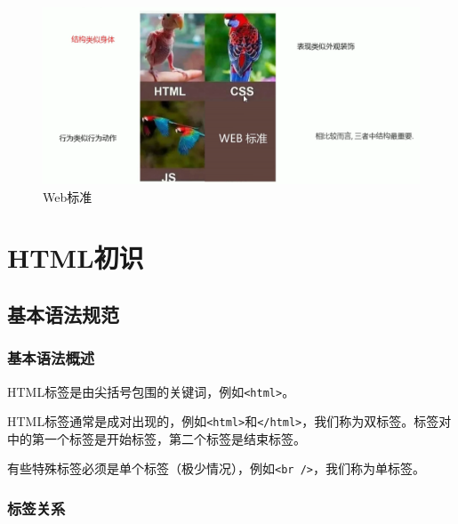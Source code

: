 \documentclass[
]{book}
\begin{document}
\begin{figure}

{\centering \includegraphics{fig/1-1} 

}

\caption{Web标准}\label{fig:unnamed-chunk-3}
\end{figure}

\hypertarget{htmlux521dux8bc6}{%
\chapter{HTML初识}\label{htmlux521dux8bc6}}

\hypertarget{ux57faux672cux8bedux6cd5ux89c4ux8303}{%
\section{基本语法规范}\label{ux57faux672cux8bedux6cd5ux89c4ux8303}}

\hypertarget{ux57faux672cux8bedux6cd5ux6982ux8ff0}{%
\subsection{基本语法概述}\label{ux57faux672cux8bedux6cd5ux6982ux8ff0}}

HTML标签是由尖括号包围的关键词，例如\texttt{\textless{}html\textgreater{}}。

HTML标签通常是成对出现的，例如\texttt{\textless{}html\textgreater{}}和\texttt{\textless{}/html\textgreater{}}，我们称为双标签。标签对中的第一个标签是开始标签，第二个标签是结束标签。

有些特殊标签必须是单个标签（极少情况），例如\texttt{\textless{}br\ /\textgreater{}}，我们称为单标签。

\hypertarget{ux6807ux7b7eux5173ux7cfb}{%
\subsection{标签关系}\label{ux6807ux7b7eux5173ux7cfb}}
\end{document}

